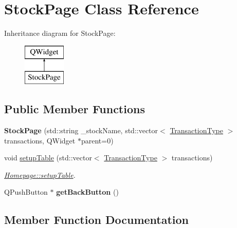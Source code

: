 \hypertarget{class_stock_page}{}\section{Stock\+Page Class Reference}
\label{class_stock_page}
Inheritance diagram for Stock\+Page\+:\begin{figure}[H]
\begin{center}
\leavevmode
\includegraphics[height=2.000000cm]{class_stock_page}
\end{center}
\end{figure}
\subsection*{Public Member Functions}
\begin{DoxyCompactItemize}
\item 
\mbox{\label{class_stock_page_aaac1451766e4189f785cb4da75a93ca5}} 
{\bfseries Stock\+Page} (std\+::string \+\_\+stock\+Name, std\+::vector$<$ \mbox{\hyperlink{class_transaction_type}{Transaction\+Type}} $>$ transactions, Q\+Widget $\ast$parent=0)
\item 
void \mbox{\hyperlink{class_stock_page_a04787aaad3379817c627c3bda98bfc04}{setup\+Table}} (std\+::vector$<$ \mbox{\hyperlink{class_transaction_type}{Transaction\+Type}} $>$ transactions)
\begin{DoxyCompactList}\small\item\em \mbox{\hyperlink{class_homepage_a8eeedb7e3e7b6144d7878e9525aad0ab}{Homepage\+::setup\+Table}}. \end{DoxyCompactList}\item 
\mbox{\label{class_stock_page_aab710b070e34b92eac8ea3fdc60eeaeb}} 
Q\+Push\+Button $\ast$ {\bfseries get\+Back\+Button} ()
\end{DoxyCompactItemize}


\subsection{Member Function Documentation}
\mbox{\label{class_stock_page_a04787aaad3379817c627c3bda98bfc04}} 

